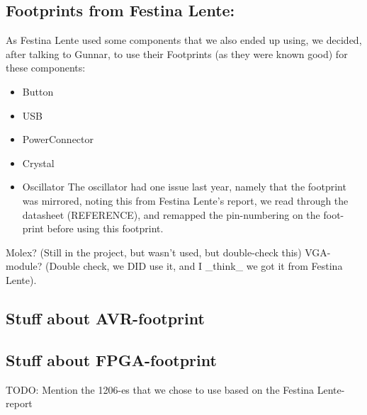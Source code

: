 \subsection {Footprints from Festina Lente:}
As Festina Lente used some components that we also ended up using, we decided,
after talking to Gunnar, to use their Footprints (as they were known good) for these
components:
\begin {itemize}
\item Button
\item USB
\item PowerConnector
\item Crystal
\item Oscillator
The oscillator had one issue last year, namely that the footprint was mirrored,
noting this from Festina Lente's report, we read through the datasheet (REFERENCE),
and remapped the pin-numbering on the foot-print before using this footprint.
\end {itemize}
Molex? (Still in the project, but wasn't used, but double-check this)
VGA-module? (Double check, we DID use it, and I \_think\_ we got it from Festina Lente).

\subsection {Stuff about AVR-footprint}
\subsection {Stuff about FPGA-footprint}

TODO: Mention the 1206-es that we chose to use based on the Festina Lente-report
